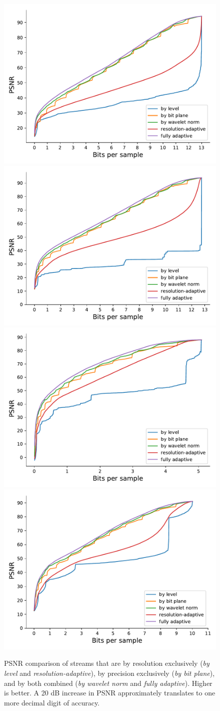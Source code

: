 \begin{figure}
	\centering
	{\includegraphics[width=0.44\linewidth]{img/motivation/magnetic-motivation.pdf}}
	{\includegraphics[width=0.44\linewidth]{img/motivation/boiler-oh-motivation.pdf}}
	{\includegraphics[width=0.44\linewidth]{img/motivation/kflame-oh-motivation.pdf}}
	{\includegraphics[width=0.44\linewidth]{img/motivation/miranda-diffusivity-motivation.pdf}}
	\caption{PSNR comparison of streams that are by resolution exclusively (\emph{by level} and
	\emph{resolution-adaptive}), by precision exclusively (\emph{by bit plane}), and by both combined
	(\emph{by wavelet norm} and \emph{fully adaptive}). Higher is better. A 20 dB increase in PSNR
	approximately translates to one more decimal digit of accuracy.}
	\label{fig:motivation}
\end{figure}

